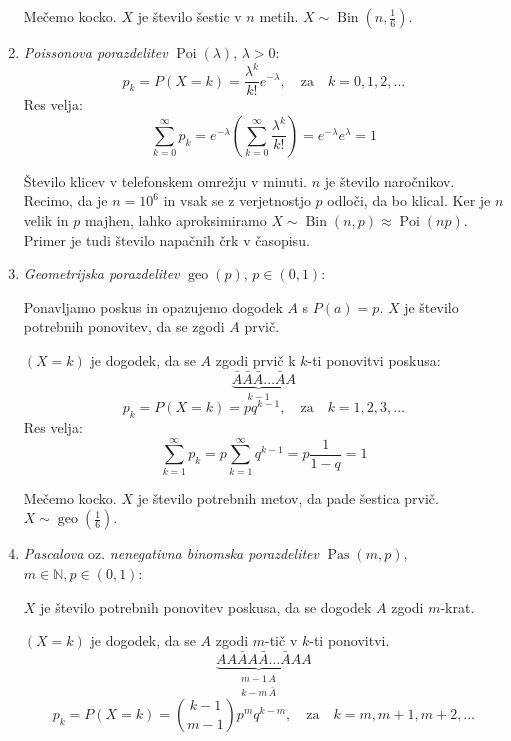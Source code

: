 \documentclass[12pt]{book}
\theoremstyle{definition}
\theoremstyle{plain}
\theoremstyle{plain}
\theoremstyle{plain}
\theoremstyle{remark}
\begin{document}
\begin{enumerate}
    \begin{zgled}
        Mečemo kocko. $X$ je število šestic v $n$ metih. $X \sim \operatorname{Bin}(n, \frac{1}{6})$.
    \end{zgled}
    \item \emph{Poissonova porazdelitev} $\operatorname{Poi}(\lambda)$, $\lambda > 0$:
    $$
    p_k=P(X=k)=\frac{\lambda^k}{k !} e^{-\lambda}, \quad \text{za} \quad k=0,1,2, \ldots
    $$
    Res velja: 
    $$
    \sum_{k=0}^{\infty} p_k=e^{-\lambda} \left(\sum_{k=0}^{\infty} \frac{\lambda^k}{k !}\right)=e^{-\lambda} e^\lambda=1
    $$
    \begin{zgled}
        Število klicev v telefonskem omrežju v minuti. $n$ je število naročnikov. Recimo, da je $n=10^6$ in vsak se z verjetnostjo $p$ odloči, da bo klical. Ker je $n$ velik in $p$ majhen, lahko aproksimiramo $X \sim \operatorname{Bin}(n,p)\approx \operatorname{Poi}(np)$. Primer je tudi število napačnih črk v časopisu. 
    \end{zgled}
    \item \emph{Geometrijska porazdelitev} $\operatorname{geo}(p)$, $p \in (0,1)$:
    
    Ponavljamo poskus in opazujemo dogodek $A$ s $P(a) = p$. $X$ je število potrebnih ponovitev, da se zgodi $A$ prvič. 

    $(X=k)$ je dogodek, da se $A$ zgodi prvič k $k$-ti ponovitvi poskusa:
    $$
    \underbrace{\bar A\bar A\bar A \ldots \bar A}_{k-1}A
    $$
    $$
    p_k=P(X=k)=p  q^{k-1}, \quad \text{za} \quad k=1, 2, 3, \ldots
    $$
    Res velja: 
    $$
    \sum_{k=1}^{\infty} p_k=p \sum_{k=1}^{\infty} q^{k-1}=p \frac{1}{1-q}=1
    $$
    \begin{zgled}
        Mečemo kocko. $X$ je število potrebnih metov, da pade šestica prvič. $X \sim \operatorname{geo}(\frac{1}{6})$.
    \end{zgled}
    \item \emph{Pascalova} oz. \emph{nenegativna binomska porazdelitev} $\operatorname{Pas}(m,p)$, $m \in \mathbb{N}, p \in (0,1)$:
    
    $X$ je število potrebnih ponovitev poskusa, da se dogodek $A$ zgodi $m$-krat.

    $(X=k)$ je dogodek, da se $A$ zgodi $m$-tič v $k$-ti ponovitvi.
    $$
    \underbrace{A A \bar A A \bar A \ldots \bar A A}_{\substack{m-1 \, A \\ k-m \, \bar A}}A
    $$
    $$
    p_k=P(X=k)=\binom{k-1}{m-1} p^m q^{k-m}, \quad \text{za} \quad k=m, m+1, m+2, \ldots
    $$


\end{enumerate}
\end{document}
